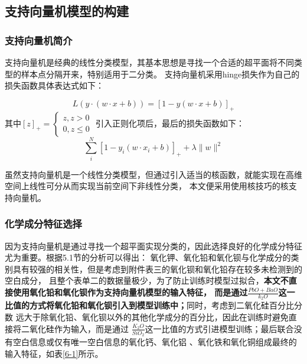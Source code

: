 \documentclass[withoutpreface,bwprint]{cumcmthesis} %
\begin{document}
\subsection{支持向量机模型的构建}

\subsubsection{支持向量机简介}

支持向量机是经典的线性分类模型，其基本思想是寻找一个合适的超平面将不同类型的样本点分隔开来，特别适用于二分类。 支持向量机采用hinge损失作为自己的损失函数具体表达式如下：

$$L(y \cdot(w \cdot x+b))=[1-y(w \cdot x+b)]_{+}$$ 其中$[z]_{+}=\left\{\begin{array}{l} z, z>0 \\ 0, z \leq 0 \end{array}\right.$
引入正则化项后，最后的损失函数如下： $$\sum_{i}^{N}\left[1-y_{i}\left(w \cdot x_{i}+b\right)\right]_{+}+\lambda\|w\|^{2}$$

虽然支持向量机是一个线性分类模型，但通过引入适当的核函数，就能实现在高维空间上线性可分从而实现当前空间下非线性分类， 本文便采用使用核技巧的核支持向量机。

\subsubsection{化学成分特征选择}

因为支持向量机是通过寻找一个超平面实现分类的，因此选择良好的化学成分特征尤为重要。根据5.1节的分析可以得出： 氧化钾、氧化铅和氧化钡与化学成分的类别具有较强的相关性，但是考虑到附件表三的氧化钡和氧化铅存在较多未检测到的空白成分， 且整个表单二的数据量极少，为了防止训练时模型过拟合，\textbf{本文不直接使用氧化铅和氧化钡作为支持向量机模型的输入特征， 而是通过$\frac{PbO+BaO}{k_{2} O}$这一比值的方式将氧化铅和氧化钡引入到模型训练中；}同时，考虑到二氧化硅百分比分数 远大于除氧化铅、氧化钡以外的其他化学成分的百分比，因此在训练时避免直接将二氧化硅作为输入，而是通过 $\frac{K_{2}O}{SiO_{2}}$这一比值的方式引进模型训练；最后联合没有空白信息或仅有唯一空白信息的氧化钙、氧化铝 、氧化铁和氧化铜组成最终的输入特征，如表\ref{6-1}所示。
\end{document}
